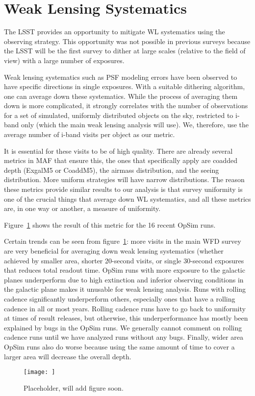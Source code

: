 \section{Weak Lensing Systematics}

The LSST provides an opportunity to mitigate WL systematics using the observing strategy. This opportunity was not possible in previous surveys because the LSST will be the first survey to dither at large scales (relative to the field of view) with a large number of exposures.

Weak lensing systematics such as PSF modeling errors have been observed to have specific directions in single exposures. With a suitable dithering algorithm, one can average down these systematics. While the process of averaging them down is more complicated, it strongly correlates with the number of observations for a set of simulated, uniformly distributed objects on the sky, restricted to i-band only (which the main weak lensing analysis will use). We, therefore, use the average number of i-band visits per object as our metric.

It is essential for these visits to be of high quality. There are already several metrics in MAF that ensure this, the ones that specifically apply are coadded depth (ExgalM5 or CoaddM5), the airmass distribution, and the seeing distribution. More uniform strategies will have narrow distributions. The reason these metrics provide similar results to our analysis is that survey uniformity is one of the crucial things that average down WL systematics, and all these metrics are, in one way or another, a measure of uniformity.

Figure~\ref{fig:WLSystematicsRankings} shows the result of this metric for the 16 recent OpSim runs. 

Certain trends can be seen from  figure~\ref{fig:WLSystematicsRankings}: more visits in the main WFD survey are very beneficial for averaging down weak lensing systematics (whether achieved by smaller area, shorter 20-second visits, or single 30-second exposures that reduces total readout time. OpSim runs with more exposure to the galactic planes underperform due to high extinction and inferior observing conditions in the galactic plane makes it unusable for weak lensing analysis. Runs with rolling cadence significantly underperform others, especially ones that have a rolling cadence in all or most years. Rolling cadence runs have to go back to uniformity at times of result releases, but otherwise, this underperformance has mostly been explained by bugs in the OpSim runs. We generally cannot comment on rolling cadence runs until we have analyzed runs without any bugs. Finally, wider area OpSim runs also do worse because using the same amount of time to cover a larger area will decrease the overall depth.

\begin{figure}[htb]
    \centering
    \caption{Placeholder, will add figure soon.}
    \label{fig:WLSystematicsRankings}
\texttt{[image: ]}
\end{figure}
